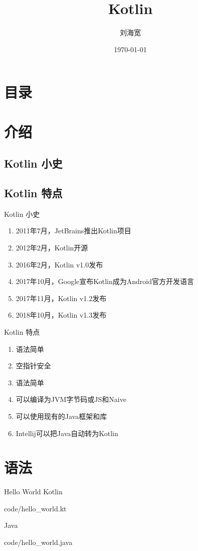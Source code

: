 \documentclass[xcolor={dvipsnames}]{beamer}
\title{Kotlin}
\author{刘海宽}
\date{\today}
\begin{document}
\begin{frame}
  \titlepage
\end{frame}

\section*{目录}
\begin{frame}
  \tableofcontents
\end{frame}

\section{介绍}
\subsection{Kotlin 小史}
\subsection{Kotlin 特点}
\begin{frame}{Kotlin 小史}
  \begin{enumerate}
  \item<1-> 2011年7月，JetBrains推出Kotlin项目
  \item<2-> 2012年2月，Kotlin开源
  \item<3-> 2016年2月，Kotlin v1.0发布
  \item<4-> 2017年10月，Google宣布Kotlin成为Android官方开发语言
  \item<5-> 2017年11月，Kotlin v1.2发布
  \item<6-> 2018年10月，Kotlin v1.3发布
  \end{enumerate}
\end{frame}

\begin{frame}{Kotlin 特点}
  \begin{enumerate}
  \item<1-> 语法简单
  \item<1-> 空指针安全
  \item<1-> 语法简单
  \item<1-> 可以编译为JVM字节码或JS和Naive
  \item<1-> 可以使用现有的Java框架和库
  \item<1-> Intellij可以把Java自动转为Kotlin
  \end{enumerate}
\end{frame}

\section{语法}
\begin{frame}[fragile]{Hello World}
  \alert{Kotlin}
    \begin{lstinputlisting}[language=Kotlin]{code/hello_world.kt}
    \end{lstinputlisting}

  \alert{Java}
    \begin{lstinputlisting}[language=java]{code/hello_world.java}
    \end{lstinputlisting}
\end{frame}
\end{document}
